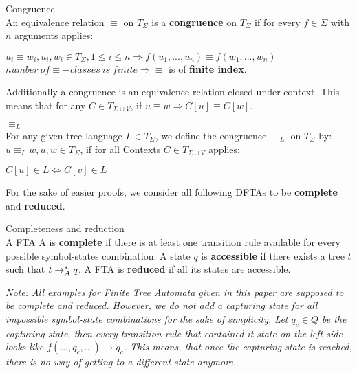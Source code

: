 \documentclass{llncs}
\begin{document}
\begin{definition}{Congruence} \cite{tata-nfta} \\
	An equivalence relation \(\equiv\)  on \(T_\Sigma\) is a \textbf{congruence} on \(T_\Sigma\) if for every \(f \in \Sigma\) with \(n\) arguments applies:
	\begin{center}
		\(u_i \equiv w_i, u_i, w_i \in T_\Sigma, 1 \leq i \leq n \Rightarrow f(u_1, ..., u_n) \equiv f(w_1, ..., w_n)\)\\
		\(number~of \equiv-classes~is~finite \Rightarrow \equiv\) is of \textbf{finite index}.
	\end{center}
	Additionally a congruence is an equivalence relation closed under context. This means that for any \(C \in T_{\Sigma \cup V}\), if \(u \equiv w \Rightarrow C[u] \equiv C[w]\).
\end{definition}

\begin{definition}{\(\equiv_L\)} \cite{tata-nfta} \\
	For any given tree language \(L \in T_\Sigma\), we define the congruence \(\equiv_L\) on \(T_\Sigma\) by: \(u \equiv_L w, u,w \in T_\Sigma\), if for all Contexts \(C \in T_{\Sigma \cup V}\) applies:
	\begin{center}
		\(C[u] \in L \iff C[v] \in L\)
	\end{center}
\end{definition}

\noindent
For the sake of easier proofs, we consider all following DFTAs to be \textbf{complete} and \textbf{reduced}.

\begin{definition}{Completeness and reduction} \cite{wiki-tree-automaton}\\
A FTA A is \textbf{complete} if there is at least one transition rule available for every possible symbol-states combination. A state \(q\) is \textbf{accessible} if there exists a tree \(t\) such that \(t \rightarrow_A^* q\). A FTA is \textbf{reduced} if all its states are accessible.
\end{definition}

\noindent
\textit{Note: All examples for Finite Tree Automata given in this paper are supposed to be complete and reduced. However, we do not add a capturing state for all impossible symbol-state combinations for the sake of simplicity. Let \(q_c \in Q\) be the capturing state, then every transition rule that contained it state on the left side looks like \(f(..., q_c, ...) \rightarrow q_c\). This means, that once the capturing state is reached, there is no way of getting to a different state anymore.}
\end{document}
